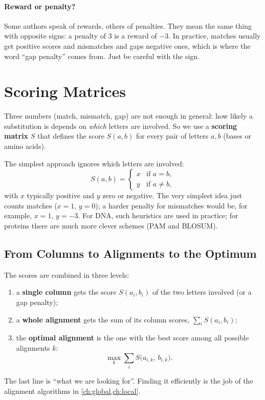 \documentclass[11pt, oneside]{book}
\let\originalsection\section
\renewcommand{\section}{\Needspace{7\baselineskip}\originalsection}
\let\originalsubsection\subsection
\renewcommand{\subsection}{\Needspace{6\baselineskip}\originalsubsection}
\begin{document}
\paragraph{Reward or penalty?}
Some authors speak of rewards, others of penalties. They mean the same thing
with opposite signs: a penalty of 3 is a reward of $-3$. In practice, matches
usually get positive scores and mismatches and gaps negative ones, which is
where the word ``gap penalty'' comes from. Just be careful with the sign.

\section{Scoring Matrices}

Three numbers (match, mismatch, gap) are not enough in general: how likely a
substitution is depends on \emph{which} letters are involved. So we use a
\textbf{scoring matrix} $S$ that defines the score $S(a,b)$ for every pair
of letters $a, b$ (bases or amino acids).

The simplest approach ignores which letters are involved:
\[
  S(a,b) = \begin{cases} x & \text{if } a = b, \\ y & \text{if } a \ne b, \end{cases}
\]
with $x$ typically positive and $y$ zero or negative. The very simplest idea
just counts matches ($x = 1$, $y = 0$); a harder penalty for mismatches would
be, for example, $x = 1$, $y = -3$. For DNA, such heuristics are used in
practice; for proteins there are much more clever schemes (PAM and BLOSUM).

\subsection{From Columns to Alignments to the Optimum}

The scores are combined in three levels:
\begin{enumerate}
  \item a \textbf{single column} gets the score $S(a_i, b_i)$ of the two letters
    involved (or a gap penalty);
  \item a \textbf{whole alignment} gets the sum of its column scores,
    $\sum_{i} S(a_i, b_i)$;
  \item the \textbf{optimal alignment} is the one with the best score among all
    possible alignments $k$:
    \[
      \max_{k} \sum_{i} S\bigl(a_{i,k},\, b_{i,k}\bigr).
    \]
\end{enumerate}
The last line is ``what we are looking for''. Finding it efficiently is the
job of the alignment algorithms in \cref{ch:global,ch:local}.
\end{document}
